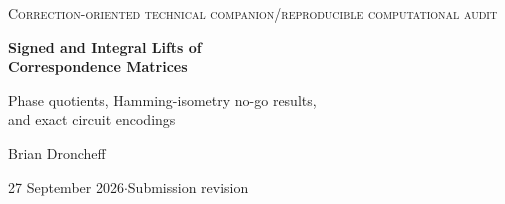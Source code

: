 \documentclass[11pt,a4paper]{article}
\theoremstyle{definition}\newtheorem{definition}[theorem]{Definition}
\theoremstyle{remark}\newtheorem{remark}[theorem]{Remark}
\newcommand{\F}{\mathbb F}
\numberwithin{equation}{section}
\begin{document}
\begin{titlepage}
\centering
\vspace*{11mm}
{\small\scshape Correction-oriented technical companion\quad /\quad reproducible computational audit\par}
\vspace{12mm}
{\LARGE\bfseries Signed and Integral Lifts of\\[5pt] Correspondence Matrices\par}
\vspace{6mm}
{\large Phase quotients, Hamming-isometry no-go results,\\and exact circuit encodings\par}
\vspace{12mm}
{\large Brian Droncheff\par}
\vspace{3mm}
{27 September 2026\quad $\cdot$\quad Submission revision\par}
\vspace{12mm}
\begin{minipage}{0.91\textwidth}
\begin{abstract}
This technical companion asks a narrow question: what survives if the four rotational positions of a correspondence matrix (CM) are treated as phase labels, and what must change before those labels can represent signed quantum amplitudes?  In the strict Boolean convolution algebra $\F_2[C_4]$, rotation is a faithful $C_4$ action but equal contributions cancel under XOR.  An elementary classification, corroborated by exhaustive enumeration of all $65{,}536$ two-branch $\F_2[C_4]$-linear operators, shows that global preservation of the coefficient Hamming weight leaves only the $32$ branch permutations with independent cyclic rotations; the full integer pair-correlation condition gives the same class.  A specified weight-four shell has $512$ preservers, but none produces the target four-sample fringe in the tested interferometer.


\end{abstract}
\end{minipage}
\end{titlepage}
\end{document}
